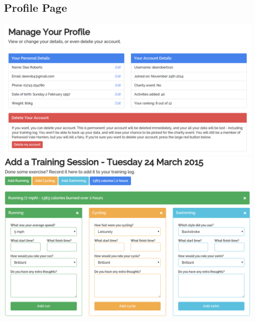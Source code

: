 \documentclass{article}[12pt,a4paper]
\begin{document}
\subsection{Profile Page}
\includegraphics[scale=0.35]{final_ui/profile}
\includegraphics[scale=0.35]{final_ui/account_delete}
\end{document}
